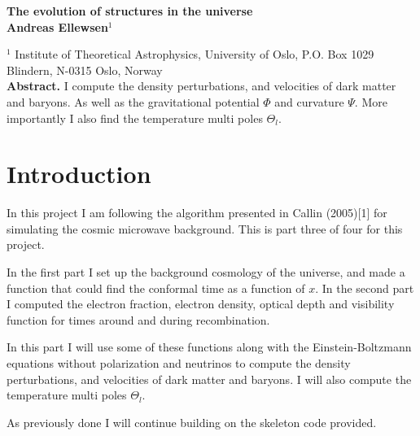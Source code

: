 \documentclass[a4paper]{report}
\begin{document}
  

\vspace*{4ex}

\begin{center}
  {\Large \bf The evolution of structures in the universe}\\[4ex]
  {\large \bf Andreas Ellewsen$^1$}\\[4ex]
  \begin{minipage}[t]{15cm}
        $^1$ Institute of Theoretical Astrophysics, University of Oslo, P.O. Box 1029 Blindern, N-0315 Oslo, Norway\\

    {\bf Abstract.} I compute the density perturbations, and velocities of dark matter and baryons. As well as the gravitational potential $\Phi$ and curvature $\Psi$. More importantly I also find the temperature multi poles $\Theta_l$.
    
  \vspace*{2ex}
  \end{minipage}
\end{center}
\section{Introduction}\label{sec:introduction}
In this project I am following the algorithm presented in Callin (2005)[1] for simulating the cosmic microwave background.  
This is part three of four for this project.

In the first part I set up the background cosmology of the universe, and made a function that could find the conformal time as a function of $x$. In the second part I computed the electron fraction, electron density, optical depth and visibility function for times around and during recombination. 

In this part I will use some of these functions along with the Einstein-Boltzmann equations without polarization and neutrinos to compute the density perturbations, and velocities of dark matter and baryons. I will also compute the temperature multi poles $\Theta_l$.

As previously done I will continue building on the skeleton code provided.

\end{document}
